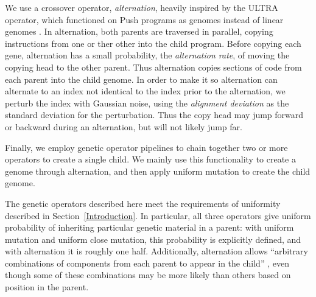 \documentclass[graybox]{svmult}
\begin{document}
We use a crossover operator, \textit{alternation}, heavily inspired by the ULTRA operator, which functioned on Push programs as genomes instead of linear genomes \cite{Spector:2013:GPTP}. In alternation, both parents are traversed in parallel, copying instructions from one or ther other into the child program. Before copying each gene, alternation has a small probability, the \textit{alternation rate}, of moving the copying head to the other parent. Thus alternation copies sections of code from each parent into the child genome. In order to make it so alternation can alternate to an index not identical to the index prior to the alternation, we perturb the index with Gaussian noise, using the \textit{alignment deviation} as the standard deviation for the perturbation. Thus the copy head may jump forward or backward during an alternation, but will not likely jump far.

Finally, we employ genetic operator pipelines to chain together two or more operators to create a single child. We mainly use this functionality to create a genome through alternation, and then apply uniform mutation to create the child genome.

The genetic operators described here meet the requirements of uniformity described in Section~\ref{Introduction}. In particular, all three operators give uniform probability of inheriting particular genetic material in a parent: with uniform mutation and uniform close mutation, this probability is explicitly defined, and with alternation it is roughly one half. Additionally, alternation allows ``arbitrary combinations of components from each parent to appear in the child'' \cite{Spector:2013:GPTP}, even though some of these combinations may be more likely than others based on position in the parent.




\end{document}
